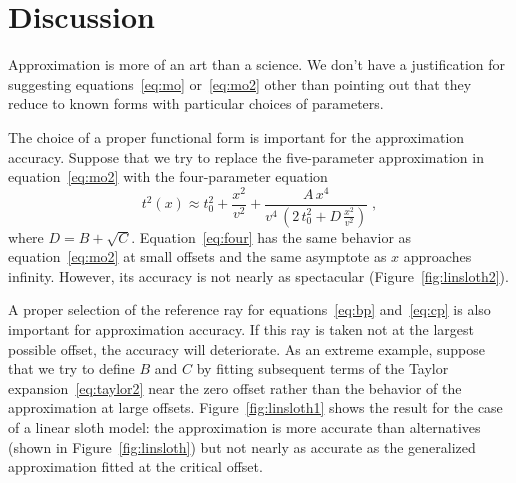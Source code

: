 


\section{Discussion}

Approximation is more of an art than a science. We don't have a
justification for suggesting equations~\ref{eq:mo} or~\ref{eq:mo2}
other than pointing out that they reduce to known forms with
particular choices of parameters.

The choice of a proper functional form is important for the
approximation accuracy. Suppose that we try to replace the
five-parameter approximation in equation~\ref{eq:mo2} with the
four-parameter equation
\begin{equation}
\label{eq:four}
t^2(x) \approx t_0^2+\frac{x^2}{v^2} + \frac{A\,x^4}
{\displaystyle v^4\,\left(2\,t_0^2+D\,\frac{x^2}{v^2}\right)}\;,
\end{equation}
where $D=B+\sqrt{C}$. Equation~\ref{eq:four} has the same behavior as
equation~\ref{eq:mo2} at small offsets and the same asymptote as $x$
approaches infinity. However, its accuracy is not nearly as
spectacular (Figure~\ref{fig:linsloth2}).

A proper selection of the reference ray for equations~\ref{eq:bp}
and~\ref{eq:cp} is also important for approximation accuracy. If this
ray is taken not at the largest possible offset, the accuracy will
deteriorate. As an extreme example, suppose that we try to define $B$
and $C$ by fitting subsequent terms of the Taylor
expansion~\ref{eq:taylor2} near the zero offset rather than the
behavior of the approximation at large
offsets. Figure~\ref{fig:linsloth1} shows the result for the case of a
linear sloth model: the approximation is more accurate than
alternatives (shown in Figure~\ref{fig:linsloth}) but not nearly as
accurate as the generalized approximation fitted at the critical offset.

